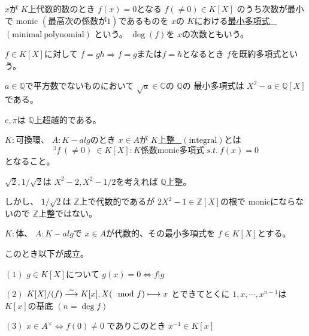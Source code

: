 \documentclass[../master_galois_theory]{subfiles}
\begin{document}
\begin{defi}
  $x$が $K$上代数的数のとき $f(x) = 0$となる $f (\neq 0) \in K[X]$
  のうち次数が最小で \rm{monic} $(最高次の係数が1)$であるものを
  $x$の $K$における\underline{最小多項式 \  $(\mathrm{minimal \  polynomial})$}
  という。
  $\deg(f)$を $x$の次数ともいう。

  $f \in K[X]$に対して $f = gh \Rightarrow f = g または f = h$となるとき
  $f$を既約多項式という。
\end{defi}

\begin{exam}
  $a \in \mathbb{Q}$で平方数でないものにおいて
  $\sqrt{a} \in \mathbb{C}$の $\mathbb{Q}$の
  最小多項式は $X^2 - a \in \mathbb{Q}[X]$である。

  $e , \pi$は $\mathbb{Q}$上超越的である。
\end{exam}

\begin{defi}
  $K:$可換環、 $A:K-alg$のとき
  $x \in A$が $K$上\underline{整 \  $(\mathrm{integral})$}とは
  \[
  {}^\exists f \  (\neq 0) \  \in K[X]:K係数 \mathrm{monic}多項式 \  s.t. \  f(x) = 0
  \]
  となること。
\end{defi}

\begin{exam}
  $\sqrt{2} , 1/\sqrt{2}$は $X^2 - 2 , X^2 - 1/2$を考えれば $\mathbb{Q}$上整。

  しかし、 $1/\sqrt{2}$は $\mathbb{Z}$上で代数的であるが
  $2X^2 - 1 \in \mathbb{Z}[X]$の根で \rm{monic}にならないので
  $\mathbb{Z}$上整ではない。
\end{exam}

\begin{prop} \label{prop:6.1}
  $K:$体、 $A:K-alg$で $x \in A$が代数的、その最小多項式を $f \in K[X]$とする。

  このとき以下が成立。

  $(1)$
  $g \in K[X]$について $g(x) = 0 \Leftrightarrow f | g$

  $(2)$
  $K[X]/(f) \overset{\sim}{\longrightarrow} K[x] , X ( \mod f) \longmapsto x$
  とできてとくに
  $1 , x , \cdots , x^{n-1}$は $K[x]$の基底 $(n = \deg f)$

  $(3)$
  $x \in A^\times \Leftrightarrow f(0) \neq 0$
  でありこのとき $x^{-1} \in K[x]$
\end{prop}
\end{document}
